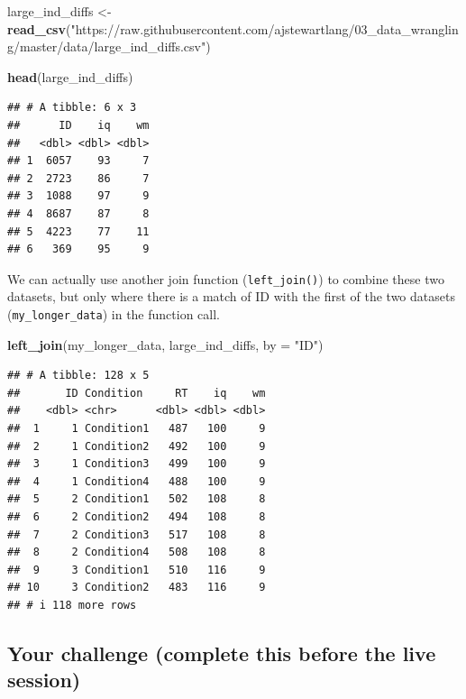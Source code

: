 \documentclass[
]{book}
\newenvironment{Shaded}{\begin{snugshade}}{\end{snugshade}}
\newcommand{\AttributeTok}[1]{\textcolor[rgb]{0.13,0.29,0.53}{#1}}
\newcommand{\FunctionTok}[1]{\textcolor[rgb]{0.13,0.29,0.53}{\textbf{#1}}}
\newcommand{\NormalTok}[1]{#1}
\newcommand{\OtherTok}[1]{\textcolor[rgb]{0.56,0.35,0.01}{#1}}
\newcommand{\StringTok}[1]{\textcolor[rgb]{0.31,0.60,0.02}{#1}}
\begin{document}
\begin{Shaded}
\begin{Highlighting}[]
\NormalTok{large\_ind\_diffs }\OtherTok{\textless{}{-}} \FunctionTok{read\_csv}\NormalTok{(}\StringTok{"https://raw.githubusercontent.com/ajstewartlang/03\_data\_wrangling/master/data/large\_ind\_diffs.csv"}\NormalTok{)}
\end{Highlighting}
\end{Shaded}

\begin{Shaded}
\begin{Highlighting}[]
\FunctionTok{head}\NormalTok{(large\_ind\_diffs)}
\end{Highlighting}
\end{Shaded}

\begin{verbatim}
## # A tibble: 6 x 3
##      ID    iq    wm
##   <dbl> <dbl> <dbl>
## 1  6057    93     7
## 2  2723    86     7
## 3  1088    97     9
## 4  8687    87     8
## 5  4223    77    11
## 6   369    95     9
\end{verbatim}

We can actually use another join function (\texttt{left\_join()}) to combine these two datasets, but only where there is a match of ID with the first of the two datasets (\texttt{my\_longer\_data}) in the function call.

\begin{Shaded}
\begin{Highlighting}[]
\FunctionTok{left\_join}\NormalTok{(my\_longer\_data, large\_ind\_diffs, }\AttributeTok{by =} \StringTok{"ID"}\NormalTok{)}
\end{Highlighting}
\end{Shaded}

\begin{verbatim}
## # A tibble: 128 x 5
##       ID Condition     RT    iq    wm
##    <dbl> <chr>      <dbl> <dbl> <dbl>
##  1     1 Condition1   487   100     9
##  2     1 Condition2   492   100     9
##  3     1 Condition3   499   100     9
##  4     1 Condition4   488   100     9
##  5     2 Condition1   502   108     8
##  6     2 Condition2   494   108     8
##  7     2 Condition3   517   108     8
##  8     2 Condition4   508   108     8
##  9     3 Condition1   510   116     9
## 10     3 Condition2   483   116     9
## # i 118 more rows
\end{verbatim}

\hypertarget{your-challenge-complete-this-before-the-live-session}{%
\subsection{Your challenge (complete this before the live session)}\label{your-challenge-complete-this-before-the-live-session}}
\end{document}
